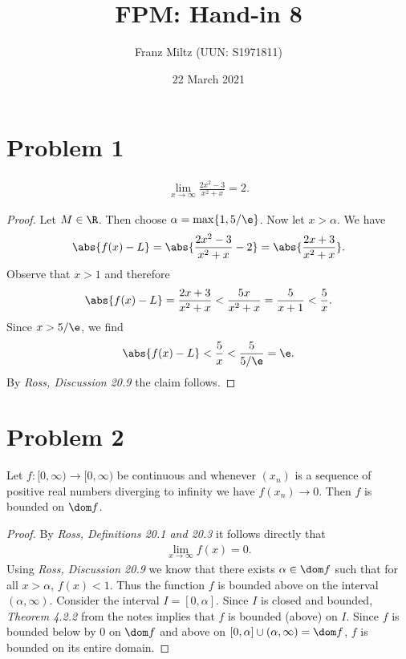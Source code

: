 \documentclass{article}
\begin{document}
\title{FPM: Hand-in 8}
\author{Franz Miltz (UUN: S1971811)}
\date{22 March 2021}
\maketitle
\mkthms
\section*{Problem 1}

\begin{claim*}
    \begin{align*}
        \lim_{x\to\infty} \frac{2x^2-3}{x^2+x}=2.
    \end{align*}
\end{claim*}

\begin{proof}
    Let $M\in\R$. Then choose $\alpha=\max\{1, 5/\e\}$. Now let $x>\alpha$.
    We have
    \begin{align*}
        \abs{f(x)-L} = \abs{\frac{2x^2-3}{x^2+x}-2} = \abs{\frac{2x+3}{x^2+x}}.
    \end{align*}
    Observe that $x>1$ and therefore
    \begin{align*}
        \abs{f(x)-L} = \frac{2x+3}{x^2+x}< \frac{5x}{x^2+x} = \frac{5}{x+1} < \frac{5}{x}.
    \end{align*}
    Since $x>5/\e$, we find
    \begin{align*}
        \abs{f(x)-L} < \frac{5}{x} < \frac{5}{5/\e} = \e.
    \end{align*}
    By \emph{Ross, Discussion 20.9} the claim follows.
\end{proof}

\section*{Problem 2}

\begin{claim*}
    Let $f:[0,\infty)\to[0,\infty)$ be continuous and whenever
    $(x_n)$ is a sequence of positive real numbers diverging to
    infinity we have $f(x_n)\to 0$. Then $f$ is bounded on $\dom f$.
\end{claim*}

\begin{proof}
    By \emph{Ross, Definitions 20.1 and 20.3} it follows directly that
    \begin{align*}
        \lim_{x\to \infty} f(x) = 0.
    \end{align*}
    Using \emph{Ross, Discussion 20.9} we know that there
    exists $\alpha\in \dom f$ such that for all $x>\alpha$, $f(x)<1$.
    Thus the function $f$ is bounded above on the interval
    $(\alpha, \infty)$. Consider the interval $I=[0,\alpha]$. Since $I$
    is closed and bounded, \emph{Theorem 4.2.2} from the notes implies
    that $f$ is bounded (above) on $I$. Since $f$ is bounded below by
    $0$ on $\dom f$ and above on $[0,\alpha]\cup(\alpha,\infty)=\dom f$,
    $f$ is bounded on its entire domain.
\end{proof}
\end{document}
